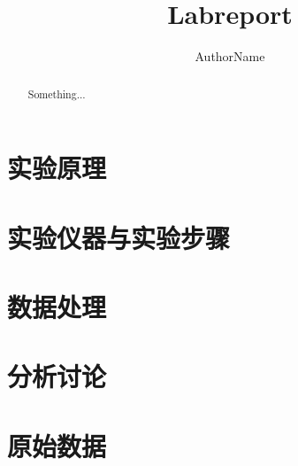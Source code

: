 \documentclass[UTF-8]{ctexart}
\title{Labreport}
\author{AuthorName}
\begin{document}
\maketitle

\begin{abstract}
  Something...
\end{abstract}

\section{实验原理}

\section{实验仪器与实验步骤}

\section{数据处理}

\section{分析讨论}

\section*{原始数据}
\end{document}

